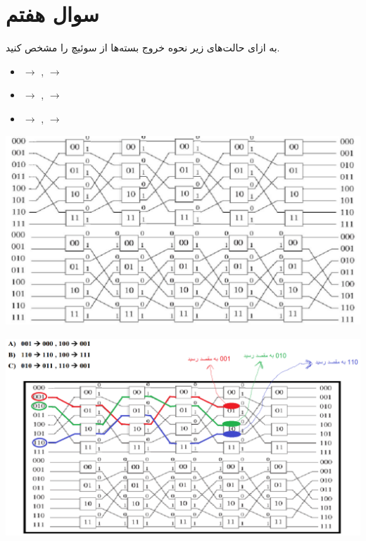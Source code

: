 \section{سوال هفتم}

به ازای حالت‌های زیر نحوه خروج بسته‌ها از سوئیچ را مشخص کنید.

\begin{latin}
	\begin{itemize}
		\item[\lr{A)}]  $\rightarrow$ ,  $\rightarrow$ 
		\item[\lr{B)}]  $\rightarrow$ ,  $\rightarrow$ 
		\item[\lr{C)}]  $\rightarrow$ ,  $\rightarrow$ 
	\end{itemize}
\end{latin}


\begin{center}
	\includegraphics*[width=1\linewidth]{pics/img4.png}
	\label{شکل مورد نظر}
\end{center}


\begin{qsolve}
	\begin{center}
		\includegraphics*[width=1\linewidth]{pics/img25.png}
	\end{center}
\end{qsolve}